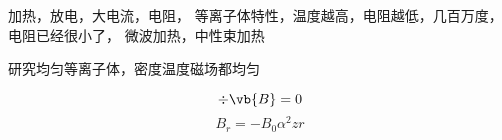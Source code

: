 加热，放电，大电流，电阻，
等离子体特性，温度越高，电阻越低，几百万度，电阻已经很小了，
微波加热，中性束加热


研究均匀等离子体，密度温度磁场都均匀 

\begin{equation*}
  \div \vb{B} = 0
\end{equation*}
\begin{equation}
  B_r = -B_0 \alpha^2 z r
\end{equation}






